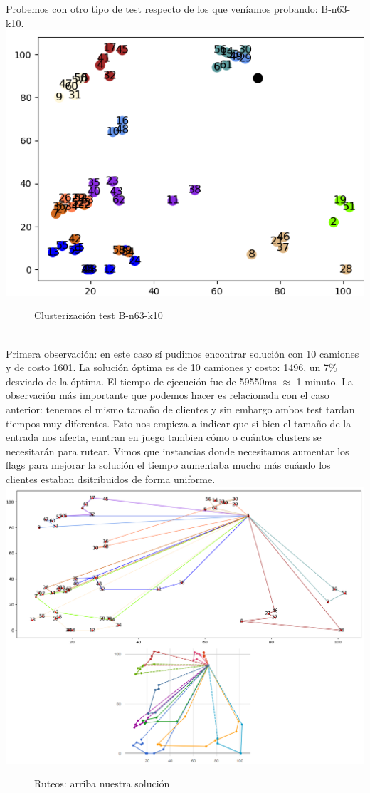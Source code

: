 \documentclass[11pt,a4paper]{article}
\begin{document}
\bigskip
Probemos con otro tipo de test respecto de los que veníamos probando: B-n63-k10.
\bigskip
\includegraphics[scale=.5]{graficos/B-n63-k10/cluster.png}
\begin{figure}[!h]
\caption{Clusterización test B-n63-k10}
\end{figure}
\\
Primera observación: en este caso sí pudimos encontrar solución con 10 camiones y de costo 1601. La solución óptima es de 10 camiones y costo: 1496, un 7\% desviado de la óptima. El tiempo de ejecución fue de 59550ms $\approx$ 1 minuto. La observación más importante que podemos hacer es relacionada con el caso anterior: tenemos el mismo tamaño de clientes y sin embargo ambos test tardan tiempos muy diferentes. Esto nos empieza a indicar que si bien el tamaño de la entrada nos afecta, enntran en juego tambien cómo o cuántos clusters se necesitarán para rutear. Vimos que instancias donde necesitamos aumentar los flags para mejorar la solución el tiempo aumentaba mucho más cuándo los clientes estaban dsitribuidos de forma uniforme.\\
\includegraphics[scale=.5]{graficos/B-n63-k10/caminos.png}
\begin{figure}[!h]
\caption{Ruteos: arriba nuestra solución}
\end{figure}
\end{document}
